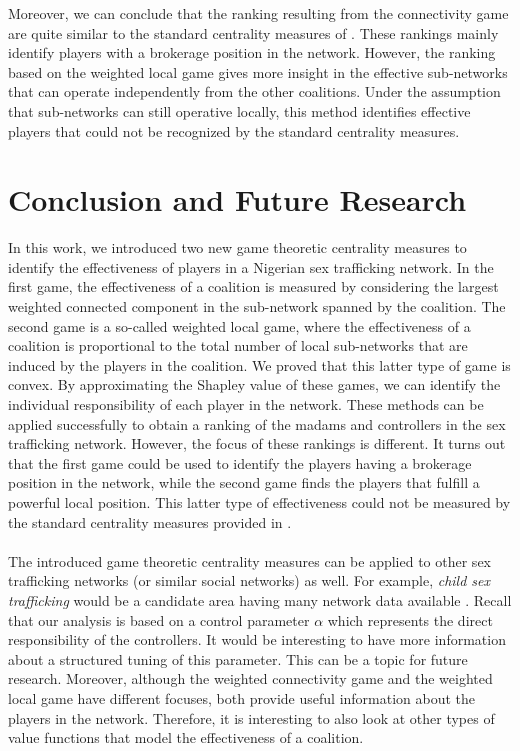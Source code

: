 \documentclass[10p]{article}
\theoremstyle{definition}
\theoremstyle{definition}
\begin{document}
Moreover, we can conclude that the ranking resulting from the connectivity game are quite similar to the standard centrality measures of \cite{mancuso2014not}. These rankings mainly identify players with a brokerage position in the network. However, the ranking based on the weighted local game gives more insight in the effective sub-networks that can operate independently from the other coalitions. Under the assumption that sub-networks can still operative locally, this method identifies effective players that could not be recognized by the standard centrality measures. 

\section{Conclusion and Future Research}
In this work, we introduced two new game theoretic centrality measures to identify the effectiveness of players in a Nigerian sex trafficking network. In the first game, the effectiveness of a coalition is measured by considering the largest weighted connected component in the sub-network spanned by the coalition. The second game is a so-called weighted local game, where the effectiveness of a coalition is proportional to the total number of local sub-networks that are induced by the players in the coalition. We proved that this latter type of game is convex. By approximating the Shapley value of these games, we can identify the individual responsibility of each player in the network. These methods can be applied successfully to obtain a ranking of the madams and controllers in the sex trafficking network. However, the focus of these rankings is different. It turns out that the first game could be used to identify the players having a brokerage position in the network, while the second game finds the players that fulfill a powerful local position. This latter type of effectiveness could not be measured by the standard centrality measures provided in \cite{mancuso2014not}.\\ \\
The introduced game theoretic centrality measures can be applied to other sex trafficking networks (or similar social networks) as well. For example, \textit{child sex trafficking} would be a candidate area having many network data available \cite{cockbain2018offender}. Recall that our analysis is based on a control parameter $\alpha$ which represents the direct responsibility of the controllers. It would be interesting to have more information about a structured tuning of this parameter. This can be a topic for future research. Moreover, although the weighted connectivity game and the weighted local game have different focuses, both provide useful information about the players in the network. Therefore, it is interesting to also look at other types of value functions that model the effectiveness of a coalition.
\end{document}
